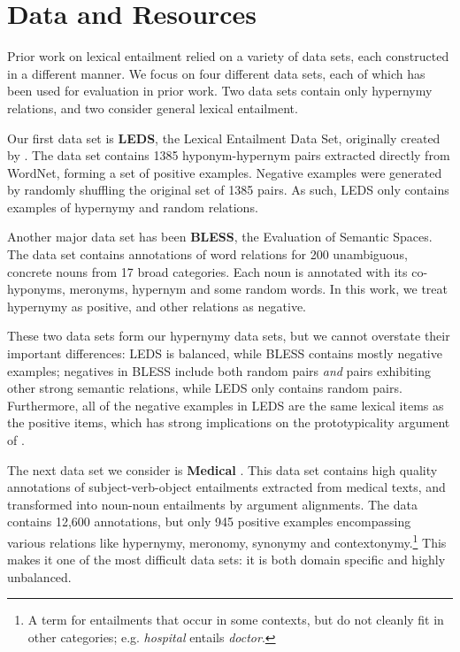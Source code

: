 \section{Data and Resources}

Prior work on lexical entailment relied on a variety of
data sets, each constructed in a different manner. We focus on
four different data sets, each of which has been used for evaluation in
prior work. Two data sets contain only hypernymy relations, and two consider
general lexical entailment.

Our first data set is {\bf LEDS}, the Lexical Entailment Data Set,
originally created by .
The data set contains 1385 hyponym-hypernym pairs extracted
directly from WordNet, forming a set of positive examples. Negative examples
were generated by randomly shuffling the original set of 1385 pairs. As such,
LEDS only contains examples of hypernymy and random relations.

Another major data set has been {\bf BLESS}, the 
Evaluation of Semantic Spaces. The data set contains annotations of word
relations for 200 unambiguous, concrete nouns from 17 broad
categories. Each noun is annotated with its co-hyponyms, meronyms, hypernym
and some random words. In this work, we treat hypernymy as positive,
and other relations as negative.

These two data sets form our hypernymy data sets, but we cannot overstate their
important differences: LEDS is balanced, while BLESS contains
mostly negative examples; negatives in BLESS include both random pairs {\em
and} pairs exhibiting other strong semantic relations, while LEDS only
contains random pairs. Furthermore, all of the negative examples in LEDS are
the same lexical items as the positive items, which has strong implications on
the prototypicality argument of .

The next data set we consider is {\bf Medical} \cite{levy:2014:conll}. This
data set contains high quality annotations of subject-verb-object entailments
extracted from medical texts, and transformed into noun-noun entailments by
argument alignments. The data contains 12,600 annotations, but only 945
positive examples encompassing various relations like hypernymy, meronomy,
synonymy and contextonymy.\footnote{A term for
entailments that occur in some contexts, but do not cleanly fit in other
categories; e.g. {\em hospital} entails {\em doctor}.} This makes it
one of the most difficult data sets: it is both domain specific and highly
unbalanced.

